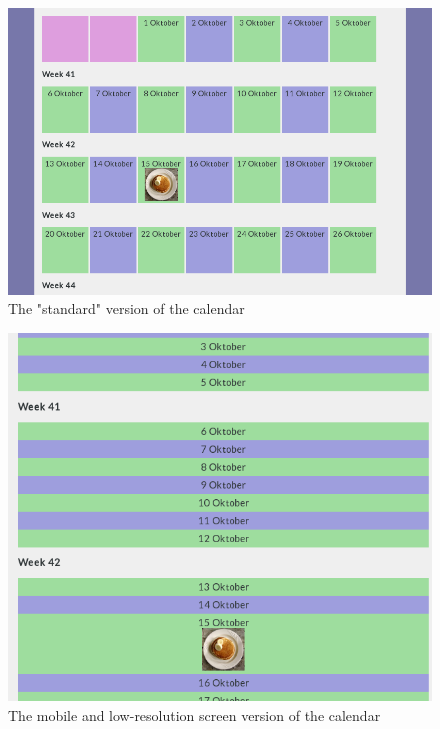 \documentclass[a4paper]{scrartcl}
\begin{document}
\begin{figure}[!h]
  \begin{center}
    \includegraphics[scale=0.4]{calendargrid.png}
    \caption{The "standard" version of the calendar}
    \label{fig:calgrid}
  \end{center}
\end{figure}

\begin{figure}[!h]
  \begin{center}
    \includegraphics[scale=0.4]{calendarvert.png}
    \caption{The mobile and low-resolution screen version of the calendar}
    \label{fig:calgrid}
  \end{center}
\end{figure}
\end{document}
